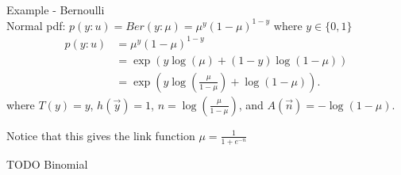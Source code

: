 \documentclass[a4paper]{article}
\begin{document}
\begin{note}{Example - Bernoulli} \\
  Normal pdf: $p(y:u) = Ber(y:\mu) = \mu^y (1-\mu)^{1-y}$ where  $y \in \{0,1\} $ 
  \begin{align*}
    p(y:u) &= \mu^y (1-\mu)^{1-y} \\
           &= \exp(y \log(\mu) + (1-y) \log(1-\mu)) \\
           &= \exp(y \log(\frac{\mu}{1 - \mu}) + \log(1-\mu))
  .\end{align*}
  where $T(y) = y$,  $h(\vec{y}) = 1$,  $n=\log(\frac{\mu}{1-\mu})$, and $A(\vec{n}) = - \log(1-\mu)$. 

  Notice that this gives the link function $\mu = \frac{1}{1+e^{-n}}$ 
\end{note}


TODO Binomial
\end{document}
